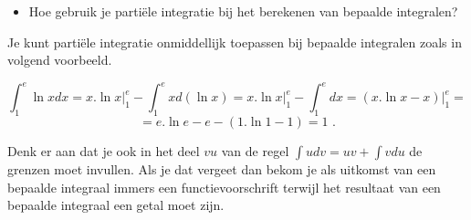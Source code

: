 \documentclass{article}
\begin{document}
\begin{itemize}
\item Hoe gebruik je parti\"ele integratie bij het berekenen van bepaalde integralen?
\end{itemize}

Je kunt parti\"ele integratie onmiddellijk toepassen bij bepaalde integralen zoals in volgend voorbeeld.

\[
\int ^e_1 \ln x dx=x.\ln x \vert ^e_1- \int ^e_1 x d(\ln x)=x.\ln x \vert ^e_1-\int ^e_1dx=(x.\ln x -x)\vert ^e_1=
\]
\[
=e.\ln e - e - (1.\ln 1 -1)=1 \text { .}
\]

Denk er aan dat je ook in het deel $vu$ van de regel $\int udv=uv+\int vdu$ de grenzen moet invullen. Als je dat vergeet dan bekom je als uitkomst van een bepaalde integraal immers een functievoorschrift terwijl het resultaat van een bepaalde integraal een getal moet zijn.
\end{document}
